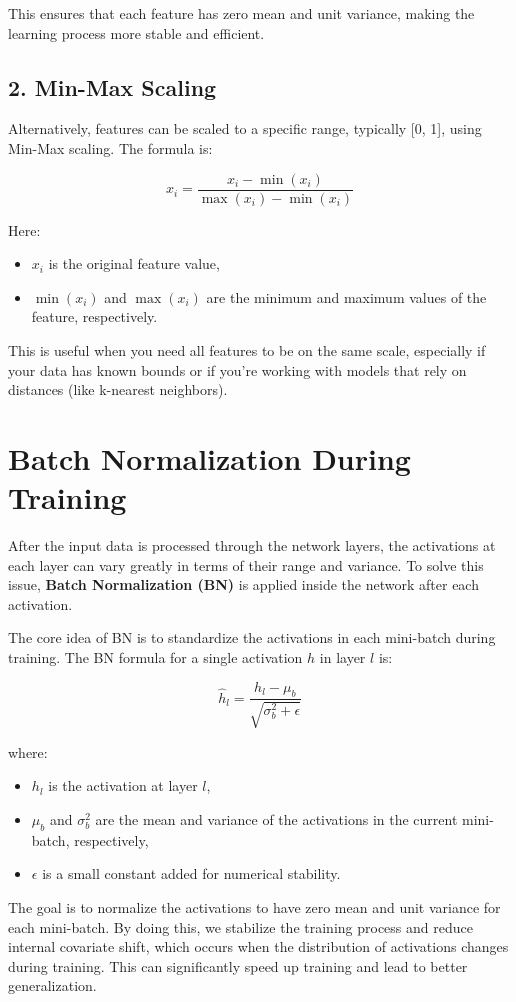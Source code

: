 \documentclass{article}
\begin{document}
This ensures that each feature has zero mean and unit variance, making the learning process more stable and efficient.

\subsection*{2. Min-Max Scaling}
Alternatively, features can be scaled to a specific range, typically [0, 1], using Min-Max scaling. The formula is:

\[
\hat{x_i} = \frac{x_i - \min(x_i)}{\max(x_i) - \min(x_i)}
\]

Here:
\begin{itemize}
    \item \(x_i\) is the original feature value,
    \item \(\min(x_i)\) and \(\max(x_i)\) are the minimum and maximum values of the feature, respectively.
\end{itemize}

This is useful when you need all features to be on the same scale, especially if your data has known bounds or if you're working with models that rely on distances (like k-nearest neighbors).

\section*{Batch Normalization During Training}
After the input data is processed through the network layers, the activations at each layer can vary greatly in terms of their range and variance. To solve this issue, \textbf{Batch Normalization (BN)} is applied inside the network after each activation.

The core idea of BN is to standardize the activations in each mini-batch during training. The BN formula for a single activation \(h\) in layer \(l\) is:

\[
\hat{h}_l = \frac{h_l - \mu_b}{\sqrt{\sigma_b^2 + \epsilon}}
\]

where:
\begin{itemize}
    \item \(h_l\) is the activation at layer \(l\),
    \item \(\mu_b\) and \(\sigma_b^2\) are the mean and variance of the activations in the current mini-batch, respectively,
    \item \(\epsilon\) is a small constant added for numerical stability.
\end{itemize}

The goal is to normalize the activations to have zero mean and unit variance for each mini-batch. By doing this, we stabilize the training process and reduce internal covariate shift, which occurs when the distribution of activations changes during training. This can significantly speed up training and lead to better generalization.
\end{document}
